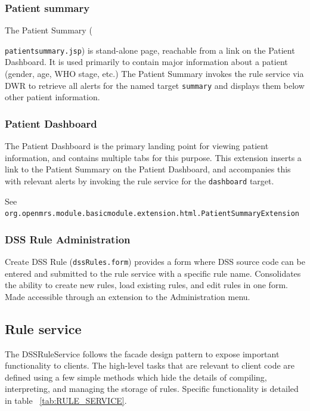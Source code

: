 \documentclass[12pt,letterpaper]{article}
\begin{document}
\subsubsection{Patient summary} \label{sec:PATIENT_SUMMARY}

The Patient Summary ({\texttt{patientsummary.jsp}) is  stand-alone page, reachable from a link on the Patient Dashboard. It is used primarily to contain major information about a patient (gender, age, WHO stage, etc.) The Patient Summary invokes the rule service via DWR to retrieve all alerts for the named target  \texttt{summary} and displays them below other patient information. 

\subsubsection{Patient Dashboard} \label{sec:PATIENT_DASHBOARD}

The Patient Dashboard is the primary landing point for viewing patient information, and contains multiple tabs for this purpose. This extension inserts a link to the Patient Summary on the Patient Dashboard, and accompanies this with relevant alerts by invoking the rule service for the \texttt{dashboard} target.

See \texttt{org.openmrs.module.basicmodule.extension.html.PatientSummaryExtension}

\subsubsection {DSS Rule Administration} 
\label{sec:DSS_RULE_ADMINISTRATION}

Create DSS Rule (\texttt{dssRules.form}) provides a form where DSS source code can be entered and submitted to the rule service with a specific rule name. Consolidates the ability to create new rules, load existing rules, and edit rules in one form. Made accessible through an extension to the Administration menu.

\subsection{Rule service} \label{sec:RULE_SERVICE}

The DSSRuleService follows the facade design pattern to expose important functionality to clients. The high-level tasks that are relevant to client code are defined using a few simple methods which hide the details of compiling, interpreting, and managing the storage of rules. Specific functionality is detailed in table ~\ref{tab:RULE_SERVICE}.

}
\end{document}
